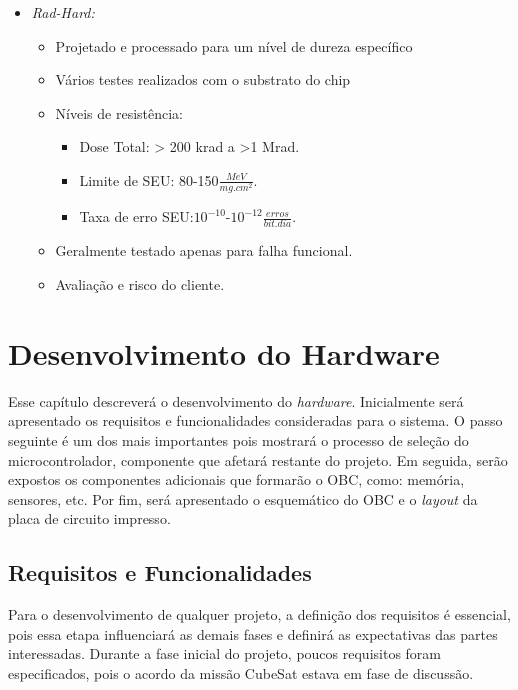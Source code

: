 \begin{itemize}
\begin{itemize}
	\end{itemize}
	
	\item \textit{Rad-Hard:}
	\begin{itemize}
		\item Projetado e processado para um nível de dureza específico
		\item Vários testes realizados com o substrato do chip
		\item Níveis de resistência: 
		\begin{itemize}
			\item Dose Total: > 200 krad a >1 Mrad.
			\item Limite de SEU: 80-150$\frac{MeV}{mg.cm^{2}}$.
			\item Taxa de erro SEU:${10^{-10}}$-$10^{-12}\frac{erros}{bit.dia}$.
		\end{itemize}  
		
		\item Geralmente testado apenas para falha funcional.
		\item Avaliação e risco do cliente.
		
	\end{itemize}
\end{itemize}


\chapter[Desenvolvimento do Hardware]{Desenvolvimento do Hardware}
\label{secaoHardware}
Esse capítulo descreverá o desenvolvimento do \textit{hardware}. Inicialmente será apresentado os requisitos e funcionalidades consideradas para o sistema. O passo seguinte é um dos mais importantes pois mostrará o processo de seleção do microcontrolador, componente que afetará restante do projeto. Em seguida, serão expostos os componentes adicionais que formarão o OBC, como: memória, sensores, etc. Por fim, será apresentado o esquemático do OBC e o \textit{layout} da placa de circuito impresso. 

\section{Requisitos e Funcionalidades}
\label{seção1_1}
Para o desenvolvimento de qualquer projeto, a definição dos requisitos é essencial, pois essa etapa influenciará as demais fases e definirá as expectativas das partes interessadas. Durante a fase inicial do projeto, poucos requisitos foram especificados, pois o acordo da missão CubeSat estava em fase de discussão. 


